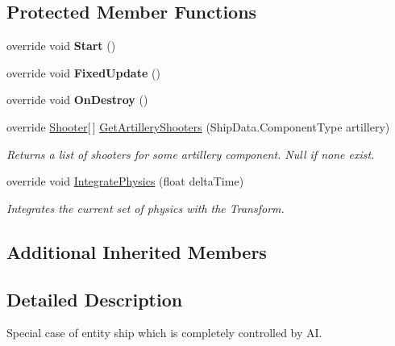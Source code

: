 \subsection*{Protected Member Functions}
\begin{DoxyCompactItemize}
\item 
\hypertarget{class_skyrates_1_1_client_1_1_entity_1_1_entity_ship_navy_ae26515dbbab5e7ccd94bc182077a3703}{override void {\bfseries Start} ()}\label{class_skyrates_1_1_client_1_1_entity_1_1_entity_ship_navy_ae26515dbbab5e7ccd94bc182077a3703}

\item 
\hypertarget{class_skyrates_1_1_client_1_1_entity_1_1_entity_ship_navy_aa550d27c1aaf35d1cf2d3c9ab6072d19}{override void {\bfseries Fixed\-Update} ()}\label{class_skyrates_1_1_client_1_1_entity_1_1_entity_ship_navy_aa550d27c1aaf35d1cf2d3c9ab6072d19}

\item 
\hypertarget{class_skyrates_1_1_client_1_1_entity_1_1_entity_ship_navy_af524017b295a99be4257b6cbd3ded232}{override void {\bfseries On\-Destroy} ()}\label{class_skyrates_1_1_client_1_1_entity_1_1_entity_ship_navy_af524017b295a99be4257b6cbd3ded232}

\item 
override \hyperlink{class_skyrates_1_1_client_1_1_mono_1_1_shooter}{Shooter}\mbox{[}$\,$\mbox{]} \hyperlink{class_skyrates_1_1_client_1_1_entity_1_1_entity_ship_navy_ab3c53268f487acadfa25c518ac90ec66}{Get\-Artillery\-Shooters} (Ship\-Data.\-Component\-Type artillery)
\begin{DoxyCompactList}\small\item\em Returns a list of shooters for some artillery component. Null if none exist. \end{DoxyCompactList}\item 
override void \hyperlink{class_skyrates_1_1_client_1_1_entity_1_1_entity_ship_navy_a689b368554044f48d19b20aed42fe104}{Integrate\-Physics} (float delta\-Time)
\begin{DoxyCompactList}\small\item\em Integrates the current set of physics with the Transform. \end{DoxyCompactList}\end{DoxyCompactItemize}
\subsection*{Additional Inherited Members}


\subsection{Detailed Description}
Special case of entity ship which is completely controlled by A\-I. 



